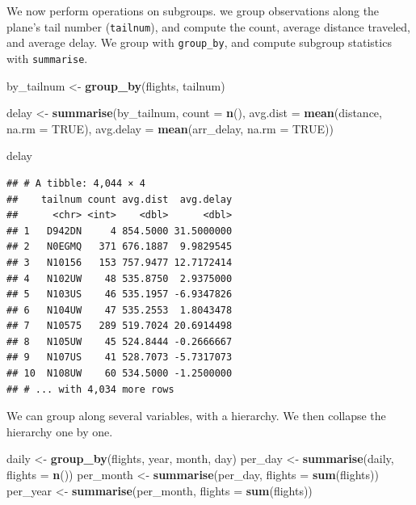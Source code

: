 \documentclass[]{book}
\newenvironment{Shaded}{\begin{snugshade}}{\end{snugshade}}
\newcommand{\KeywordTok}[1]{\textcolor[rgb]{0.13,0.29,0.53}{\textbf{{#1}}}}
\newcommand{\DataTypeTok}[1]{\textcolor[rgb]{0.13,0.29,0.53}{{#1}}}
\newcommand{\StringTok}[1]{\textcolor[rgb]{0.31,0.60,0.02}{{#1}}}
\newcommand{\OtherTok}[1]{\textcolor[rgb]{0.56,0.35,0.01}{{#1}}}
\newcommand{\NormalTok}[1]{{#1}}
\theoremstyle{definition}
\theoremstyle{definition}
\theoremstyle{remark}
\begin{document}
We now perform operations on subgroups. we group observations along the
plane's tail number (\texttt{tailnum}), and compute the count, average
distance traveled, and average delay. We group with \texttt{group\_by},
and compute subgroup statistics with \texttt{summarise}.

\begin{Shaded}
\begin{Highlighting}[]
\NormalTok{by_tailnum <-}\StringTok{ }\KeywordTok{group_by}\NormalTok{(flights, tailnum)}

\NormalTok{delay <-}\StringTok{ }\KeywordTok{summarise}\NormalTok{(by_tailnum,}
  \DataTypeTok{count =} \KeywordTok{n}\NormalTok{(),}
  \DataTypeTok{avg.dist =} \KeywordTok{mean}\NormalTok{(distance, }\DataTypeTok{na.rm =} \OtherTok{TRUE}\NormalTok{),}
  \DataTypeTok{avg.delay =} \KeywordTok{mean}\NormalTok{(arr_delay, }\DataTypeTok{na.rm =} \OtherTok{TRUE}\NormalTok{))}

\NormalTok{delay}
\end{Highlighting}
\end{Shaded}

\begin{verbatim}
## # A tibble: 4,044 × 4
##    tailnum count avg.dist  avg.delay
##      <chr> <int>    <dbl>      <dbl>
## 1   D942DN     4 854.5000 31.5000000
## 2   N0EGMQ   371 676.1887  9.9829545
## 3   N10156   153 757.9477 12.7172414
## 4   N102UW    48 535.8750  2.9375000
## 5   N103US    46 535.1957 -6.9347826
## 6   N104UW    47 535.2553  1.8043478
## 7   N10575   289 519.7024 20.6914498
## 8   N105UW    45 524.8444 -0.2666667
## 9   N107US    41 528.7073 -5.7317073
## 10  N108UW    60 534.5000 -1.2500000
## # ... with 4,034 more rows
\end{verbatim}

We can group along several variables, with a hierarchy. We then collapse
the hierarchy one by one.

\begin{Shaded}
\begin{Highlighting}[]
\NormalTok{daily <-}\StringTok{ }\KeywordTok{group_by}\NormalTok{(flights, year, month, day)}
\NormalTok{per_day   <-}\StringTok{ }\KeywordTok{summarise}\NormalTok{(daily, }\DataTypeTok{flights =} \KeywordTok{n}\NormalTok{())}
\NormalTok{per_month <-}\StringTok{ }\KeywordTok{summarise}\NormalTok{(per_day, }\DataTypeTok{flights =} \KeywordTok{sum}\NormalTok{(flights))}
\NormalTok{per_year  <-}\StringTok{ }\KeywordTok{summarise}\NormalTok{(per_month, }\DataTypeTok{flights =} \KeywordTok{sum}\NormalTok{(flights))}
\end{Highlighting}
\end{Shaded}
\end{document}

